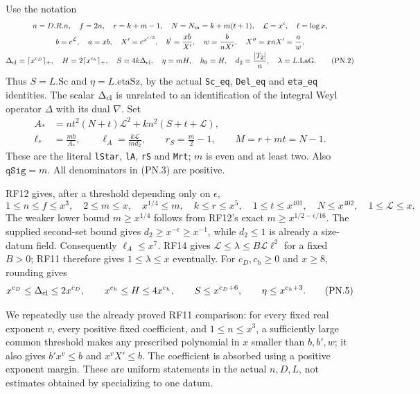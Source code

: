 \documentclass[11pt,a4paper]{article}
\numberwithin{equation}{section}
\theoremstyle{remark}\newtheorem{remark}[theorem]{Remark}
\begin{document}
Use the notation
\begin{gather*}
 n=D.R.n,\quad f=2n,\quad r=k+m-1,\quad
 N=N_m=k+m(t+1),\quad \mathcal L=x^\epsilon,\quad\ell=\log x,\\
 b=e^{\mathcal L},\quad a=xb,\quad X'=e^{x^{\epsilon/3}},\quad
 b'=\frac{xb}{X'},\quad w=\frac{b}{nX'},\quad X''=xnX'=\frac{a}{w},\\
 \Delta_{\rm cl}=\lceil x^{c_D}\rceil_+,\quad
 H=2\lceil x^{c_h}\rceil_+,\quad
 S=4k\Delta_{\rm cl},\quad\eta=mH,\quad h_0=H,\quad
 d_2=\frac{|T_2|}{n},\quad\lambda=L.\mathrm{LaG}.
                                                               \tag{PN.2}
\end{gather*}
Thus $S=L.\mathrm{Sc}$ and $\eta=L.\mathrm{etaSz}$, by the actual
\texttt{Sc\_\allowbreak eq}, \texttt{Del\_\allowbreak eq} and \texttt{eta\_\allowbreak eq} identities.
The scalar $\Delta_{\rm cl}$ is unrelated to an identification of the
integral Weyl operator $\Delta$ with its dual $\nabla$.
Set
\begin{align*}
 A_*&=nt^2(N+t)\mathcal L^2+kn^2(S+t+\mathcal L),\\
 \ell_*&=\frac{mb}{A_*},\qquad
 \ell_A=\frac{k\mathcal L}{md_2},\qquad
 r_S=\frac m2-1,\qquad M=r+mt=N-1.
                                                               \tag{PN.3}
\end{align*}
These are the literal \texttt{lStar}, \texttt{lA}, \texttt{rS} and
\texttt{Mrt}; $m$ is even and at least two. Also
$\texttt{qSig}=m$. All denominators in (PN.3) are positive.

RF12 gives, after a threshold depending only on $\epsilon$,
\[
 1\leq n\leq f\leq x^3,\quad
 2\leq m\leq x,\quad x^{1/4}\leq m,\quad
 k\leq r\leq x^5,\quad
 1\leq t\leq x^{401},\quad N\leq x^{402},\quad
 1\leq\mathcal L\leq x.                                    \tag{PN.4}
\]
The weaker lower bound $m\geq x^{1/4}$ follows from RF12's exact
$m\geq x^{1/2-\epsilon/16}$. The supplied second-set bound gives
$d_2\geq x^{-\epsilon}\geq x^{-1}$, while $d_2\leq1$ is already a
size-datum field. Consequently $\ell_A\leq x^7$. RF14 gives
$\mathcal L\leq\lambda\leq B\mathcal L\ell^2$ for a fixed $B>0$;
RF11 therefore gives $1\leq\lambda\leq x$ eventually.
For $c_D,c_h\geq0$ and $x\geq8$, rounding gives
\[
 x^{c_D}\leq\Delta_{\rm cl}\leq2x^{c_D},\qquad
 x^{c_h}\leq H\leq4x^{c_h},\qquad
 S\leq x^{c_D+6},\qquad \eta\leq x^{c_h+3}.             \tag{PN.5}
\]

We repeatedly use the already proved RF11 comparison: for every fixed
real exponent $v$, every positive fixed coefficient, and
$1\leq n\leq x^3$, a sufficiently large common threshold makes any
prescribed polynomial in $x$ smaller than $b,b',w$; it also gives
$b'x^v\leq b$ and $x^vX'\leq b$. The coefficient is absorbed using a
positive exponent margin. These are uniform statements in the actual
$n,D,L$, not estimates obtained by specializing to one datum.
\end{document}
